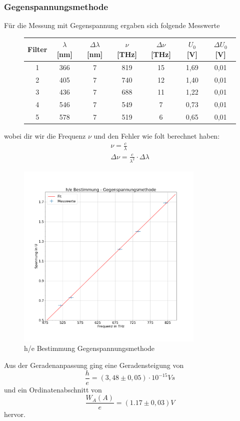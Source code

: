 \documentclass{scrartcl}
\begin{document}
		\subsubsection{Gegenspannungsmethode}
			Für die Messung mit Gegenspannung ergaben sich folgende Messwerte 
			\begin{figure}[H]
				\centering
				\begin{tabular}{|c|c|c|c|c|c|c|}
					\hline
					Filter & $\lambda$ [nm] & $\Delta\lambda$ [nm] & $\nu$ [THz] & $\Delta\nu$ [THz] & $U_0$ [V] & $\Delta U_0$ [V] \\
					
					\hline
					1 & 366 & 7 & 819 & 15 & 1,69 & 0,01\\
					2 & 405 & 7 & 740 & 12 & 1,40 & 0,01\\ 
					3 & 436 & 7 & 688 & 11 & 1,22 & 0,01\\
					4 & 546 & 7 & 549 & 7 & 0,73 & 0,01\\
					5 & 578 & 7 & 519 & 6 & 0,65 & 0,01\\
					\hline
				\end{tabular}
			\end{figure}
			wobei dir wir die Frequenz $\nu$ und den Fehler wie folt berechnet haben:
			\begin{align}
				\nu = \frac{c}{\lambda} \\
				\Delta \nu = \frac{c}{\lambda^2} \cdot \Delta \lambda
			\end{align}
			\begin{figure}[H]
				\centering
				\includegraphics[width=0.8\textwidth]{he_gegenspannung.png}
				\caption{h/e Bestimmung Gegenspannungsmethode}
			\end{figure}
			Aus der Geradenanpassung ging eine Geradensteigung von 
			\begin{equation}
				\frac{h}{e} = (3,48\pm 0,05)\cdot 10^{-15}V s
			\end{equation}
			und ein Ordinatenabschnitt von
			\begin{equation}
				\frac{W_A(A)}{e} = (1.17\pm 0,03)V
			\end{equation}
			hervor.
\end{document}
